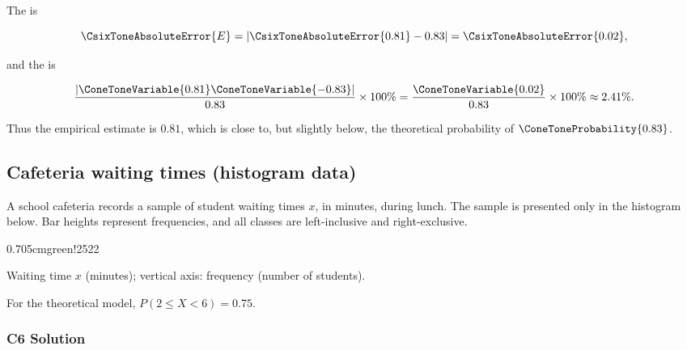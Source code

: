 The   is

\[
\CsixToneAbsoluteError{E}=|\CsixToneAbsoluteError{0.81}-0.83|=\CsixToneAbsoluteError{0.02},
\]

and the   is

\[
\frac{|\ConeToneVariable{0.81}\ConeToneVariable{-0.83}|}{0.83}\times100\%
=\frac{\ConeToneVariable{0.02}}{0.83}\times100\%
\approx2.41\%.
\]

Thus the empirical estimate is $0.81$, which is close to, but slightly
below, the theoretical probability of $\ConeToneProbability{0.83}$.



\subsection{Cafeteria waiting times (histogram data)}
\label{sec:c6-only-histogram}

A school cafeteria records a sample of student waiting times $x$, in minutes,
during lunch. The sample is presented only in the histogram below. Bar heights
represent frequencies, and all classes are left-inclusive and right-exclusive.

    {0.70\textwidth}{5cm}{green!25}{2}{2}

\begin{center}
    Waiting time $x$ (minutes); vertical axis: frequency (number of students).
\end{center}

For the theoretical model, $P(2\leq X<6)=0.75$.


\subsubsection*{C6 Solution}
\label{subsec:c6-only-histogram-solution}

